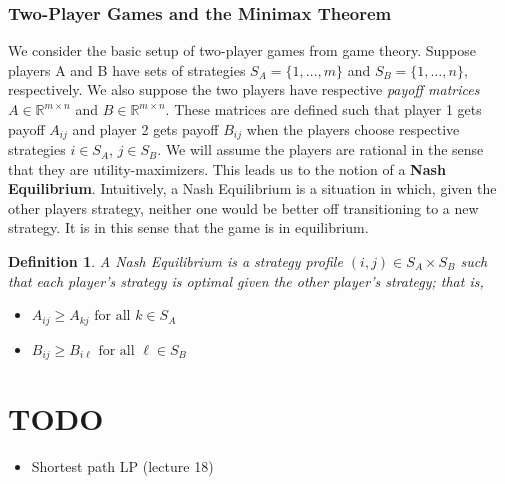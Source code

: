 \documentclass[12pt]{article}
\newcommand{\R}{\mathcal{R}}
\def\R{\mathbb{R}}
\newtheorem{definition}{Definition}
\begin{document}
\subsubsection{Two-Player Games and the Minimax Theorem}
We consider the basic setup of two-player games from game theory. Suppose players A and B have sets of strategies $S_A = \{1, \dots, m\}$ and 
$S_B = \{1, \dots, n\}$, respectively. We also suppose the two players have respective \textit{payoff matrices} $A \in \R^{m \times n}$ and 
$B \in \R^{m \times n}$. These matrices are defined such that player 1 gets payoff $A_{ij}$ and player 2 gets payoff $B_{ij}$ when 
the players choose respective strategies $i \in S_A$, $j \in S_B$. We will assume the players are rational in the sense that they are utility-maximizers. 
This leads us to the notion of a \textbf{Nash Equilibrium}. Intuitively, a Nash Equilibrium is a situation in which, given the other players strategy, neither one
would be better off transitioning to a new strategy. It is in this sense that the game is in equilibrium. 
\begin{definition}
 A Nash Equilibrium is a strategy profile $(i, j) \in S_A \times S_B$ such that each player's strategy is optimal given the other player's strategy; that is, 
 \begin{itemize}
 \item $A_{ij} \geq A_{kj} \text{ for all } k \in S_A$ 
 \item $B_{ij} \geq B_{i\ell} \text{ for all } \ell \in S_B$
 \end{itemize}
\end{definition}


	
\section{TODO}
\begin{itemize}
\item Shortest path LP (lecture 18)
\end{itemize}
	
	
\end{document}
